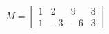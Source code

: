 \documentclass{article}
\begin{document}
\[ M = \begin{bmatrix}
1 & 2 & 9 & 3 \\
1 & -3 & -6 & 3
\end{bmatrix} \]
\end{document}
